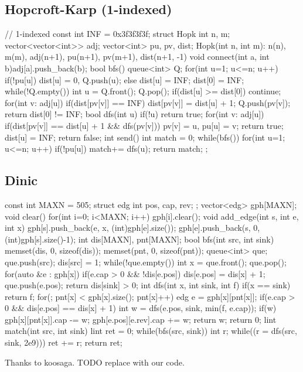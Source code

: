 \subsection{Hopcroft-Karp (1-indexed)}
\begin{cpp}
// 1-indexed
const int INF = 0x3f3f3f3f;
struct Hopk{
  int n, m; vector<vector<int>> adj;
  vector<int> pu, pv, dist;
  Hopk(int n, int m): n(n), m(m), adj(n+1),
    pu(n+1), pv(m+1), dist(n+1, -1) {}
  void connect(int a, int b){adj[a].push_back(b);}
  bool bfs(){
    queue<int> Q;
    for(int u=1; u<=n; u++){
      if(!pu[u]) dist[u] = 0, Q.push(u);
      else dist[u] = INF;
    }
    dist[0] = INF;
    while(!Q.empty()){
      int u = Q.front(); Q.pop();
      if(dist[u] >= dist[0]) continue;
      for(int v: adj[u]) if(dist[pv[v]] == INF){
        dist[pv[v]] = dist[u] + 1;
        Q.push(pv[v]);
      }
    }
    return dist[0] != INF;
  }
  bool dfs(int u){
    if(!u) return true;
    for(int v: adj[u])
      if(dist[pv[v]] == dist[u] + 1 && dfs(pv[v])){
        pv[v] = u, pu[u] = v; return true;
    }
    dist[u] = INF;
    return false;
  }
  int send(){
    int match = 0;
    while(bfs()) for(int u=1; u<=n; u++)
      if(!pu[u]) match+= dfs(u);
    return match;
  }
};
\end{cpp}

\subsection{Dinic}
\begin{cpp}
const int MAXN = 505;
struct edg{ int pos, cap, rev; };
vector<edg> gph[MAXN];
void clear(){ for(int i=0; i<MAXN; i++) gph[i].clear(); }
void add_edge(int s, int e, int x){
  gph[s].push_back({e, x, (int)gph[e].size()});
  gph[e].push_back({s, 0, (int)gph[s].size()-1});
}
int dis[MAXN], pnt[MAXN];
bool bfs(int src, int sink){
  memset(dis, 0, sizeof(dis));
  memset(pnt, 0, sizeof(pnt));
  queue<int> que;
  que.push(src);
  dis[src] = 1;
  while(!que.empty()){
    int x = que.front();
    que.pop();
    for(auto &e : gph[x]){
      if(e.cap > 0 && !dis[e.pos]){
        dis[e.pos] = dis[x] + 1;
        que.push(e.pos);
      }
    }
  }
  return dis[sink] > 0;
}
int dfs(int x, int sink, int f){
  if(x == sink) return f;
  for(; pnt[x] < gph[x].size(); pnt[x]++){
    edg e = gph[x][pnt[x]];
    if(e.cap > 0 && dis[e.pos] == dis[x] + 1){
      int w = dfs(e.pos, sink, min(f, e.cap));
      if(w){
        gph[x][pnt[x]].cap -= w;
        gph[e.pos][e.rev].cap += w;
        return w;
      }
    }
  }
  return 0;
}
lint match(int src, int sink){
  lint ret = 0;
  while(bfs(src, sink)){
    int r;
    while((r = dfs(src, sink, 2e9))) ret += r;
  }
  return ret;
}
\end{cpp}
Thanks to koosaga. TODO replace with our code.


